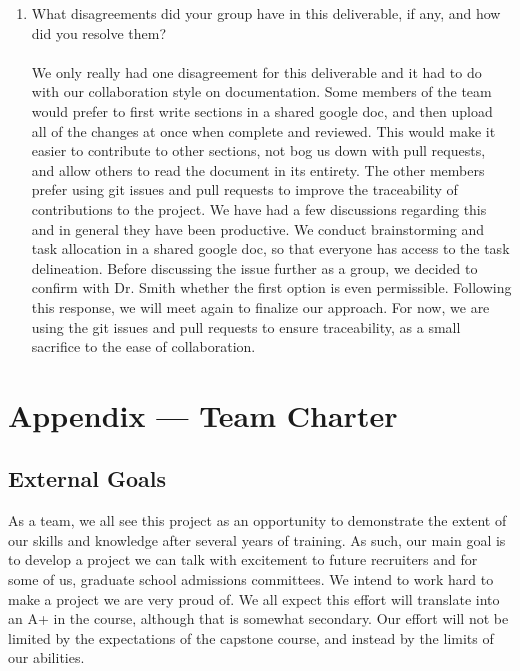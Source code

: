 \documentclass{article}
\begin{document}
\begin{itemize}
\begin{enumerate}
    \item What disagreements did your group have in this deliverable, if any,
    and how did you resolve them?\\\\
    We only really had one disagreement for this deliverable and it had to do with our collaboration style on documentation. Some members of the team would prefer to 
    first write sections in a shared google doc, and then upload all of the changes at once when complete and reviewed. This would make it easier to contribute to 
    other sections, not bog us down with pull requests, and allow others to read the document in its entirety. The other members prefer using git issues and pull requests
    to improve the traceability of contributions to the project. We have had a few discussions regarding this and in general they have been productive. We conduct
    brainstorming and task allocation in a shared google doc, so that everyone has access to the task delineation. Before discussing the issue further as a group,
    we decided to confirm with Dr. Smith whether the first option is even permissible. Following this response, we will meet again to finalize our approach. For now, 
    we are using the git issues and pull requests to ensure traceability, as a small sacrifice to the ease of collaboration.
\end{enumerate}



\newpage{}

\section*{Appendix --- Team Charter}


\subsection*{External Goals}

As a team, we all see this project as an opportunity to demonstrate the extent of our skills and knowledge after several years of training.
As such, our main goal is to develop a project we can talk with excitement to future recruiters and for some of us, graduate school admissions committees.
We intend to work hard to make a project we are very proud of. We all expect this effort will translate into an A+ in the course, although that is somewhat
secondary. Our effort will not be limited by the expectations of the capstone course, and instead by the limits of our abilities.


\end{itemize}
\end{document}
